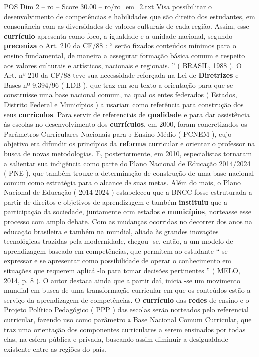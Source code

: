 \begin{textsample}{POS Dim 2 – ro – Score 30.00 – ro/ro\_em\_2.txt}
Visa possibilitar o desenvolvimento de competências e habilidades que são direito dos estudantes, em consonância com as diversidades de valores culturais de cada região.
Assim, esse \textbf{currículo} apresenta como foco, a igualdade e a unidade nacional, segundo \textbf{preconiza} o Art. 210 da CF/88 : “ serão fixados conteúdos mínimos para o ensino fundamental, de maneira a assegurar formação básica comum e respeito aos valores culturais e artísticos, nacionais e regionais. ” ( BRASIL, 1988 ).
O Art. nº 210 da CF/88 teve sua necessidade reforçada na Lei de \textbf{Diretrizes} e Bases nº 9.394/96 ( LDB ), que traz em seu texto a orientação para que se construísse uma base nacional comum, na qual os entes federados ( Estados, Distrito Federal e Municípios ) a usariam como referência para construção dos seus \textbf{currículos}.
Para servir de referenciais de \textbf{qualidade} e para dar assistência às escolas no desenvolvimento dos \textbf{currículos}, em 2000, foram concretizados os Parâmetros Curriculares Nacionais para o Ensino Médio ( PCNEM ), cujo objetivo era difundir os princípios da \textbf{reforma} curricular e orientar o professor na busca de novas metodologias.
E, posteriormente, em 2010, especialistas tornaram a salientar sua indigência como parte do Plano Nacional de Educação 2014/2024 ( PNE ), que também trouxe a determinação de construção de uma base nacional comum como estratégia para o alcance de suas metas.
Além do mais, o Plano Nacional de Educação ( 2014-2024 ) estabeleceu que a BNCC fosse estruturada a partir de direitos e objetivos de aprendizagem e também \textbf{instituiu} que a participação da sociedade, juntamente com estados e \textbf{municípios}, norteasse esse processo com amplo debate.
Com as mudanças ocorridas no decorrer dos anos na educação brasileira e também na mundial, aliada às grandes inovações tecnológicas trazidas pela modernidade, chegou -se, então, a um modelo de aprendizagem baseado em competências, que permitem ao estudante “ se expressar e se apresentar como possibilidade de operar o conhecimento em situações que requerem aplicá -lo para tomar decisões pertinentes ” ( MELO, 2014, p. 8 ).
O autor destaca ainda que a partir daí, inicia -se um movimento mundial em busca de uma transformação curricular em que os conteúdos estão a serviço da aprendizagem de competências.
O \textbf{currículo} das \textbf{redes} de ensino e o Projeto Político Pedagógico ( PPP ) das escolas serão norteados pelo referencial curricular, fazendo uso como parâmetro a Base Nacional Comum Curricular, que traz uma orientação dos componentes curriculares a serem ensinados por todas elas, na esfera pública e privada, buscando assim diminuir a desigualdade existente entre as regiões do país.

\end{textsample}
